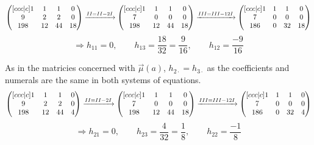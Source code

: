         \[   \begin{pmatrix}[c c c | c]
                1 & 1 & 1 & 0 \\
                9 & 2 & 2 & 0 \\
                198 & 12 & 44 & 18 \\
            \end{pmatrix} 
            \xrightarrow{\rom{2} = \rom{2} - 2\rom{1}} 
            \begin{pmatrix}[c c c | c]
                1 & 1 & 1 & 0 \\
                7 & 0 & 0 & 0 \\
                198 & 12 & 44 & 18 \\
            \end{pmatrix} 
            \xrightarrow{\rom{3} = \rom{3} - 12\rom{1}} 
            \begin{pmatrix}[c c c | c]
                1 & 1 & 1 & 0 \\
                7 & 0 & 0 & 0 \\
                186 & 0 & 32 & 18 \\
            \end{pmatrix} 
        \] 
        \[
            \Rightarrow h_{11} = 0, \qquad h_{13} = \frac{18}{32} = \frac{9}{16}, \qquad h_12 = \frac{-9}{16}
        \]
        
        
        As in the matricies concerned with $\overrightarrow{\mu}(a)$, $h_{2\cdot} = h_{3\cdot}$ as the coefficients and numerals are the same in both systems of equations.
        \[   \begin{pmatrix}[c c c | c]
                1 & 1 & 1 & 0 \\
                9 & 2 & 2 & 0 \\
                198 & 12 & 44 & 4 \\
            \end{pmatrix} 
            \xrightarrow{\rom{2} = \rom{2} - 2\rom{1}} 
            \begin{pmatrix}[c c c | c]
                1 & 1 & 1 & 0 \\
                7 & 0 & 0 & 0 \\
                198 & 12 & 44 & 18 \\
            \end{pmatrix} 
            \xrightarrow{\rom{3} = \rom{3} - 12\rom{1}} 
            \begin{pmatrix}[c c c | c]
                1 & 1 & 1 & 0 \\
                7 & 0 & 0 & 0 \\
                186 & 0 & 32 & 4 \\
            \end{pmatrix} 
        \] 
        \[
            \Rightarrow h_{21} = 0, \qquad h_{23} = \frac{4}{32} = \frac{1}{8}, \qquad h_{22} = \frac{-1}{8}
        \]

